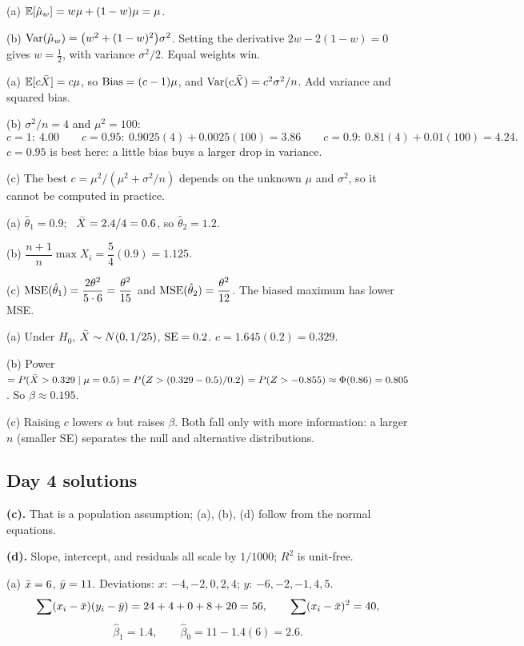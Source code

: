 \documentclass[11pt]{article}
\begin{document}
(a) $\mathbb{E}[\hat\mu_w]=w\mu+(1-w)\mu=\mu$.

(b) $\operatorname{Var}(\hat\mu_w)=\big(w^2+(1-w)^2\big)\sigma^2$. Setting the derivative $2w-2(1-w)=0$ gives $w=\tfrac12$, with variance $\sigma^2/2$. Equal weights win.

(a) $\mathbb{E}[c\bar{X}]=c\mu$, so $\operatorname{Bias}=(c-1)\mu$, and $\operatorname{Var}(c\bar{X})=c^2\sigma^2/n$. Add variance and squared bias.

(b) $\sigma^2/n=4$ and $\mu^2=100$:
\[ c=1:\ 4.00 \qquad c=0.95:\ 0.9025(4)+0.0025(100)=3.86 \qquad c=0.9:\ 0.81(4)+0.01(100)=4.24. \]
$c=0.95$ is best here: a little bias buys a larger drop in variance.

(c) The best $c=\mu^2/(\mu^2+\sigma^2/n)$ depends on the unknown $\mu$ and $\sigma^2$, so it cannot be computed in practice.

(a) $\hat\theta_1=0.9$; \ $\bar{X}=2.4/4=0.6$, so $\hat\theta_2=1.2$.

(b) $\dfrac{n+1}{n}\max X_i=\dfrac54(0.9)=1.125$.

(c) $\operatorname{MSE}(\hat\theta_1)=\dfrac{2\theta^2}{5\cdot6}=\dfrac{\theta^2}{15}$ and $\operatorname{MSE}(\hat\theta_2)=\dfrac{\theta^2}{12}$. The biased maximum has lower MSE.

(a) Under $H_0$, $\bar{X}\sim N(0,1/25)$, $\operatorname{SE}=0.2$. $c=1.645(0.2)=0.329$.

(b) Power $=P(\bar{X}>0.329\mid\mu=0.5)=P\big(Z>(0.329-0.5)/0.2\big)=P(Z>-0.855)\approx\Phi(0.86)=0.805$. So $\beta\approx0.195$.

(c) Raising $c$ lowers $\alpha$ but raises $\beta$. Both fall only with more information: a larger $n$ (smaller SE) separates the null and alternative distributions.

\subsection{Day 4 solutions}

 \textbf{(c).} That is a population assumption; (a), (b), (d) follow from the normal equations.

 \textbf{(d).} Slope, intercept, and residuals all scale by $1/1000$; $R^2$ is unit-free.

(a) $\bar{x}=6$, $\bar{y}=11$. Deviations: $x$: $-4,-2,0,2,4$; $y$: $-6,-2,-1,4,5$.
\[ \sum(x_i-\bar{x})(y_i-\bar{y})=24+4+0+8+20=56, \qquad \sum(x_i-\bar{x})^2=40, \]\[ \hat\beta_1=1.4, \qquad \hat\beta_0=11-1.4(6)=2.6. \]
\end{document}
